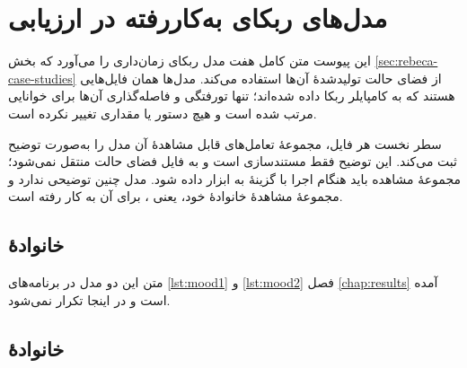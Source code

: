 
\chapter{مدل‌های ربکای به‌کاررفته در ارزیابی}
\label{app:rebeca-models}

این پیوست متن کامل هفت مدل ربکای زمان‌داری را می‌آورد که بخش \ref{sec:rebeca-case-studies} از فضای حالت تولیدشدهٔ آن‌ها استفاده می‌کند. مدل‌ها همان فایل‌هایی هستند که به کامپایلر ربکا داده شده‌اند؛ تنها تورفتگی و فاصله‌گذاری آن‌ها برای خوانایی مرتب شده است و هیچ دستور یا مقداری تغییر نکرده است.

سطر نخست هر فایل، مجموعهٔ تعامل‌های قابل مشاهدهٔ آن مدل را به‌صورت توضیح ثبت می‌کند. این توضیح فقط مستندسازی است و به فایل فضای حالت منتقل نمی‌شود؛ مجموعهٔ مشاهده باید هنگام اجرا با گزینهٔ  به ابزار داده شود. مدل  چنین توضیحی ندارد و مجموعهٔ مشاهدهٔ خانوادهٔ خود، یعنی ، برای آن به کار رفته است.

\section{خانوادهٔ }

متن این دو مدل در برنامه‌های \ref{lst:mood1} و \ref{lst:mood2} فصل \ref{chap:results} آمده است و در اینجا تکرار نمی‌شود.

\section{خانوادهٔ }

\begin{latin}
\singlespacing

\end{latin}

\begin{latin}
\singlespacing

\end{latin}

\begin{latin}
\singlespacing

\end{latin}

